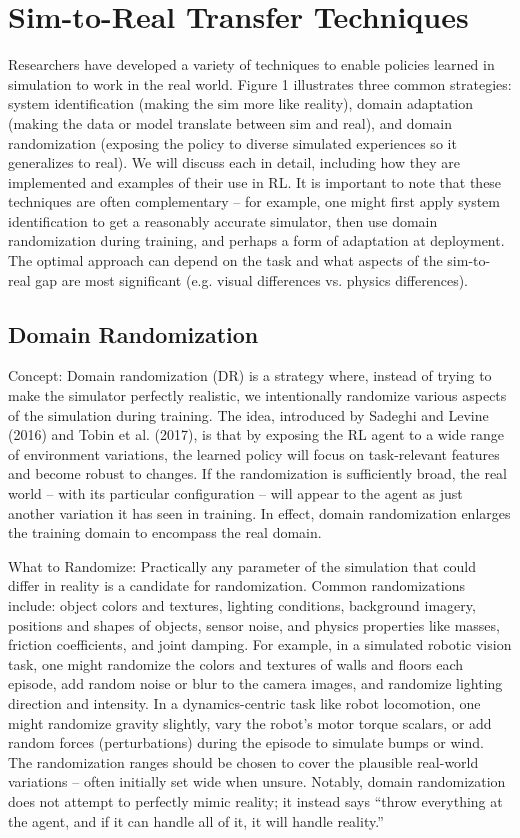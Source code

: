 \usepackage{listings}
\section{Sim-to-Real Transfer Techniques}

Researchers have developed a variety of techniques to enable policies learned in simulation to work in the real world. Figure 1 illustrates three common strategies: system identification (making the sim more like reality), domain adaptation (making the data or model translate between sim and real), and domain randomization (exposing the policy to diverse simulated experiences so it generalizes to real). We will discuss each in detail, including how they are implemented and examples of their use in RL. It is important to note that these techniques are often complementary – for example, one might first apply system identification to get a reasonably accurate simulator, then use domain randomization during training, and perhaps a form of adaptation at deployment. The optimal approach can depend on the task and what aspects of the sim-to-real gap are most significant (e.g. visual differences vs. physics differences).

\subsection{Domain Randomization}
Concept: Domain randomization (DR) is a strategy where, instead of trying to make the simulator perfectly realistic, we intentionally randomize various aspects of the simulation during training. The idea, introduced by Sadeghi and Levine (2016) and Tobin et al. (2017), is that by exposing the RL agent to a wide range of environment variations, the learned policy will focus on task-relevant features and become robust to changes. If the randomization is sufficiently broad, the real world – with its particular configuration – will appear to the agent as just another variation it has seen in training. In effect, domain randomization enlarges the training domain to encompass the real domain.

What to Randomize: Practically any parameter of the simulation that could differ in reality is a candidate for randomization. Common randomizations include: object colors and textures, lighting conditions, background imagery, positions and shapes of objects, sensor noise, and physics properties like masses, friction coefficients, and joint damping. For example, in a simulated robotic vision
task, one might randomize the colors and textures of walls and floors each episode, add random noise or blur to the camera images, and randomize lighting direction and intensity. In a dynamics-centric task like robot locomotion, one might randomize gravity slightly, vary the robot’s motor torque scalars, or add random forces (perturbations) during the episode to simulate bumps or wind. The randomization
ranges should be chosen to cover the plausible real-world variations – often initially set wide when unsure. Notably, domain randomization does not attempt to perfectly mimic reality; it instead says “throw everything at the agent, and if it can handle all of it, it will handle reality.”

